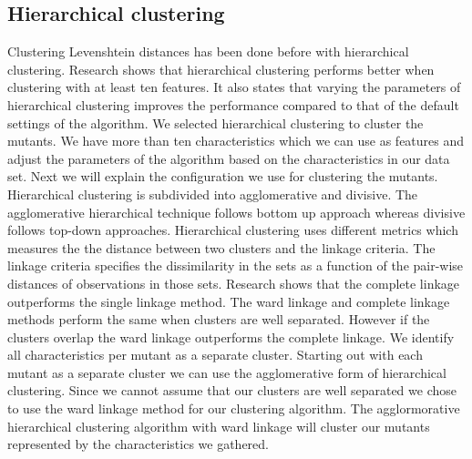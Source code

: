 \documentclass[../main]{subfiles}
\begin{document}
\subsection{Hierarchical clustering}
Clustering Levenshtein distances has been done before with hierarchical clustering\cite{Rajalingam2011HierarchicalStudy, Gothai2010PerformanceAlgorithms}. 
Research shows that hierarchical clustering performs better when clustering with at least ten features\cite{Rodriguez2019}.
It also states that varying the parameters of hierarchical clustering improves the performance compared to that of the default settings of the algorithm\cite{Rodriguez2019}.
We selected hierarchical clustering to cluster the mutants.
We have more than ten characteristics which we can use as features and adjust the parameters of the algorithm based on the characteristics in our data set.
Next we will explain the configuration we use for clustering the mutants. 
\newline
Hierarchical clustering is subdivided into agglomerative and divisive. 
The agglomerative hierarchical technique follows bottom up approach whereas divisive follows top-down approaches.
Hierarchical clustering uses different metrics which measures the the distance between two clusters and the linkage criteria\cite{Rajalingam2011HierarchicalStudy}. 
The linkage criteria specifies the dissimilarity in the sets as a function of the pair-wise distances of observations in those sets\cite{Rajalingam2011HierarchicalStudy}.
\newline
Research shows that the complete linkage outperforms the single linkage method\cite{Vijaya2019ComparativeClustering}.
The ward linkage and complete linkage methods perform the same when clusters are well separated\cite{Vijaya2019ComparativeClustering}.
However if the clusters overlap the ward linkage outperforms the complete linkage\cite{Vijaya2019ComparativeClustering}.
\newline
We identify all characteristics per mutant as a separate cluster.
Starting out with each mutant as a separate cluster we can use the agglomerative form of hierarchical clustering.
Since we cannot assume that our clusters are well separated we chose to use the ward linkage method for our clustering algorithm.
The agglormorative hierarchical clustering algorithm with ward linkage will cluster our mutants represented by the characteristics we gathered.
\end{document}
